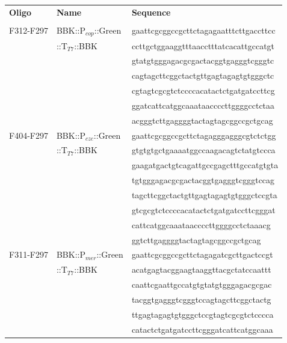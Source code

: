 \newpage
\makeatletter
\setlength{\@fptop}{0pt}
\makeatother
\begin{table}[ht!]
\label{table:333}
{%
\begin{tabular*}{\columnwidth}{@{}lll@{}}
\hline
\textbf{Oligo} & \textbf{Name} & \textbf{Sequence}
\\
\\
\hline
F312-F297 & BBK::P$_{cop}$::Green & \MakeLowercase{GAATTCGCGGCCGCTTCTAGAGAATTTCTTGACCTTCC}
\\
& ::T$_{T7}$::BBK & \MakeLowercase{CCTTGCTGGAAGGTTTAACCTTTATCACATTGCCATGT}
\\
&  & \MakeLowercase{GTATGTGGGAGACGCGACTACGGTGAGGGTCGGGTC}
\\
&  & \MakeLowercase{CAGTAGCTTCGGCTACTGTTGAGTAGAGTGTGGGCTC}
\\
& & \MakeLowercase{CGTAGTCGCGTCTCCCCACATACTCTGATGATCCTTCG}
\\
& & \MakeLowercase{GGATCATTCATGGCAAATAACCCCTTGGGGCCTCTAA} 
\\
& & \MakeLowercase{ACGGGTCTTGAGGGGtactagtagcggccgctgcag} 
\\
F404-F297 & BBK::P$_{czc}$::Green & \MakeLowercase{GAATTCGCGGCCGCTTCTAGAGggagggcgtctctgg}
\\
&::T$_{T7}$::BBK & \MakeLowercase{gtgtgtgctgaaaatggccaagacagtctatgtccca}
\\
& & \MakeLowercase{gaagatgactgtcagattgccgagctTTGCCATGTGTA}
\\
& & \MakeLowercase{TGTGGGAGACGCGACTACGGTGAGGGTCGGGTCCAG}
\\
& & \MakeLowercase{TAGCTTCGGCTACTGTTGAGTAGAGTGTGGGCTCCGTA}
\\
& & \MakeLowercase{GTCGCGTCTCCCCACATACTCTGATGATCCTTCGGGAT}
\\
&&\MakeLowercase{CATTCATGGCAAATAACCCCTTGGGGCCTCTAAACG}
\\
& & \MakeLowercase{GGTCTTGAGGGGtactagtagcggccgctgcag}
\\
F311-F297 & BBK::P$_{mer}$::Green & \MakeLowercase{GAATTCGCGGCCGCTTCTAGAGATCGCTTGACTCCGT}
\\
& ::T$_{T7}$::BBK& \MakeLowercase{ACATGAGTACGGAAGTAAGGTTACGCTATCCAATTT}
\\
&  & \MakeLowercase{CAATTCGAATTGCCATGTGTATGTGGGAGACGCGAC}
\\
& & \MakeLowercase{TACGGTGAGGGTCGGGTCCAGTAGCTTCGGCTACTG}
\\
&& \MakeLowercase{TTGAGTAGAGTGTGGGCTCCGTAGTCGCGTCTCCCCA}
\\
& & \MakeLowercase{CATACTCTGATGATCCTTCGGGATCATTCATGGCAAA}

\end{tabular*}}
\end{table}

